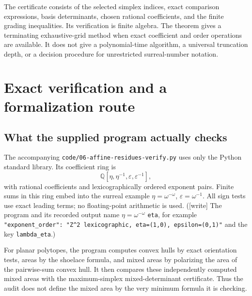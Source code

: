 \documentclass[11pt,a4paper]{article}
\numberwithin{equation}{section}
\theoremstyle{plain}
\newcommand{\wtag}{\textup{[write]}}%
\newcommand{\Q}{\mathbb Q}
\newcommand{\eps}{\varepsilon}
\newcommand{\pathcode}[1]{\nolinkurl{#1}}
\begin{document}
The certificate consists of the selected simplex indices, exact
comparison expressions, basis determinants, chosen rational coefficients,
and the finite grading inequalities. Its verification is finite algebra.
The theorem gives a terminating exhaustive-grid method when exact
coefficient and order operations are available. It does not give a
polynomial-time algorithm, a universal truncation depth, or a decision
procedure for unrestricted surreal-number notation.

\section{Exact verification and a formalization route}
\label{poly:mv:sec:verification}

\subsection{What the supplied program actually checks}
The accompanying \pathcode{code/06-affine-residues-verify.py} uses only the Python standard
library. Its coefficient ring is
\[
 \Q[\eta,\eta^{-1},\eps,\eps^{-1}],
\]
with rational coefficients and lexicographically ordered exponent pairs.
Finite sums in this ring embed into the surreal example
$\eta=\omega^{-\omega}$, $\eps=\omega^{-1}$. All sign tests use exact
leading terms; no floating-point arithmetic is used.
(\wtag{} The program and its recorded output name $\eta=\omega^{-\omega}$
\texttt{eta}, for example
\texttt{"exponent\_order": "Z\^{}2 lexicographic, eta=(1,0), epsilon=(0,1)"}
and the key \texttt{lambda\_eta}.)

For planar polytopes, the program computes convex hulls by exact
orientation tests, areas by the shoelace formula, and mixed areas by
polarizing the area of the pairwise-sum convex hull. It then compares
these independently computed mixed areas with the maximum-simplex
mixed-determinant certificate. Thus the audit does not define the mixed
area by the very minimum formula it is checking.
\end{document}
